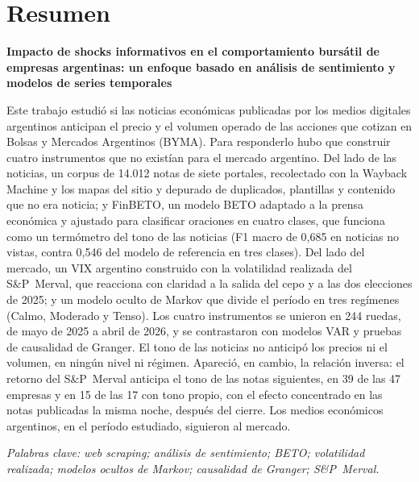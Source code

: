 \documentclass[11pt,a4paper,oneside]{report}
\begin{document}
\chapter*{Resumen}
\begin{center}
  {\titulos\large\bfseries Impacto de shocks informativos en el comportamiento bursátil de
  empresas argentinas: un enfoque basado en análisis de sentimiento y modelos de series
  temporales\par}
\end{center}
\vspace{4pt}

Este trabajo estudió si las noticias económicas publicadas por los medios digitales
argentinos anticipan el precio y el volumen operado de las acciones que cotizan en Bolsas y
Mercados Argentinos (BYMA). Para responderlo hubo que construir cuatro instrumentos que no
existían para el mercado argentino. Del lado de las noticias, un corpus de 14.012 notas de
siete portales, recolectado con la Wayback Machine y los mapas del sitio y depurado de
duplicados, plantillas y contenido que no era noticia; y FinBETO, un modelo BETO adaptado a la
prensa económica y ajustado para clasificar oraciones en cuatro clases, que funciona como un
termómetro del tono de las noticias (F1 macro de 0,685 en noticias no vistas, contra 0,546 del
modelo de referencia en tres clases). Del lado del mercado, un VIX argentino construido con la
volatilidad realizada del S\&P~Merval, que reacciona con claridad a la salida del cepo y a las
dos elecciones de 2025; y un modelo oculto de Markov que divide el período en tres regímenes
(Calmo, Moderado y Tenso). Los cuatro instrumentos se unieron en 244 ruedas, de mayo de 2025 a
abril de 2026, y se contrastaron con modelos VAR y pruebas de causalidad de Granger. El tono de
las noticias no anticipó los precios ni el volumen, en ningún nivel ni régimen. Apareció, en
cambio, la relación inversa: el retorno del S\&P~Merval anticipa el tono de las notas
siguientes, en 39 de las 47 empresas y en 15 de las 17 con tono propio, con el efecto
concentrado en las notas publicadas la misma noche, después del cierre. Los medios económicos
argentinos, en el período estudiado, siguieron al mercado.

\vspace{6pt}
\textit{Palabras clave:} \textit{web scraping; análisis de sentimiento; BETO; volatilidad
realizada; modelos ocultos de Markov; causalidad de Granger; S\&P~Merval.}
\end{document}
